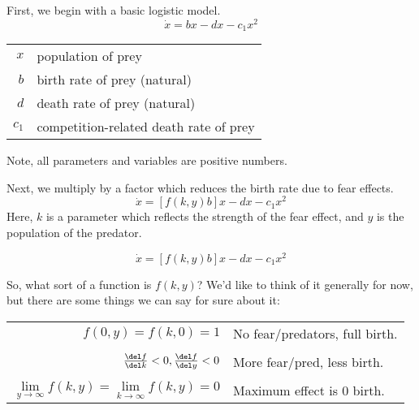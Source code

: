 \documentclass[a5paper]{article}
\theoremstyle{definition}%
\numberwithin{exercise}{section}
\theoremstyle{remark}%
\begin{document}
First, we begin with a basic logistic model. 
$$\dot{x}=bx-dx-c_1x^2$$

\begin{center}
\begin{tabular}{rl}
$x$& population of prey\\
$b$& birth rate of prey (natural)\\
$d$& death rate of prey (natural)\\
$c_1$& competition-related death rate of prey\\
\end{tabular} 
\end{center}
Note, all parameters and variables are positive numbers. 
  
%			
%           



Next, we multiply by a factor which reduces the birth rate due to fear effects. 
$$\dot{x}=[f(k,y)b]x-dx-c_1x^2$$
Here, $k$ is a parameter which reflects the strength of the fear effect, and $y$ is the population of the predator.



$$\dot{x}=[f(k,y)b]x-dx-c_1x^2$$

\mbox{}

So, what sort of a function is $f(k,y)$? We'd like to think of it generally for now, but there are some things we can say for sure about it:

\mbox{}

\begin{highlight}
\begin{tabular}{rl}
$f(0,y)=f(k,0)=1$ & No fear/predators, full birth.\\
\\
$\frac{\del f}{\del k}<0, \frac{\del f}{\del y}<0$& More fear/pred, less birth.\\
\\
$\lim\limits_{y\to\infty}f(k,y)=\lim\limits_{k\to\infty}f(k,y)=0$& Maximum effect is 0 birth.\\
\end{tabular}
\end{highlight}
\end{document}
